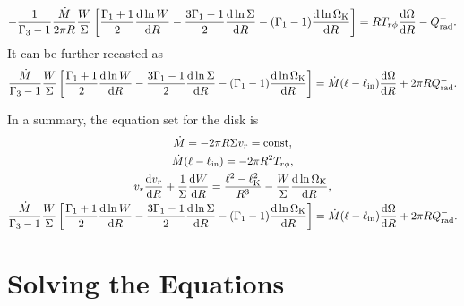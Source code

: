 \documentclass[oneside]{book}
\def\rd{{\rm d}}
\begin{document}
\begin{equation}
-\frac{1}{\Gamma_3-1}\frac{\dot M}{2\pi R}\frac{W}{\Sigma}
\left[\frac{\Gamma_1+1}{2}\frac{\rd \ln W}{\rd R}-
\frac{3\Gamma_1-1}{2}\frac{\rd \ln \Sigma}{\rd R}
-(\Gamma_1-1)\frac{\rd\ln\Omega_{\rm K}}{\rd R}\right]
=RT_{r\phi}\frac{\rd\Omega}{\rd R}-Q_{\rm rad}^-.
\end{equation}
It can be further recasted as
\begin{equation}
\frac{\dot M}{\Gamma_3-1}\frac{W}{\Sigma}
\left[\frac{\Gamma_1+1}{2}\frac{\rd \ln W}{\rd R}-
\frac{3\Gamma_1-1}{2}\frac{\rd \ln \Sigma}{\rd R}
-(\Gamma_1-1)\frac{\rd\ln\Omega_{\rm K}}{\rd R}\right]
=\dot M (\ell-\ell_{\rm in})\frac{\rd\Omega}{\rd R}+2\pi R Q_{\rm rad}^-.
\end{equation}

In a summary, the equation set for the disk is 
\begin{gather}
 \dot M=-2\pi R\Sigma v_r={\rm const},\\
\dot M(\ell-\ell_{\rm in})=-2\pi R^2 T_{r\phi},\\
v_r\frac{\rd v_r}{\rd R}+\frac{1}{\Sigma}\frac{\rd W}{\rd R}=
\frac{\ell^2-\ell_{\rm K}^2}{R^3}-\frac{W}{\Sigma}\frac{\rd\ln\Omega_{\rm K}}{\rd R},\\
\frac{\dot M}{\Gamma_3-1}\frac{W}{\Sigma}
\left[\frac{\Gamma_1+1}{2}\frac{\rd \ln W}{\rd R}-
\frac{3\Gamma_1-1}{2}\frac{\rd \ln \Sigma}{\rd R}
-(\Gamma_1-1)\frac{\rd\ln\Omega_{\rm K}}{\rd R}\right]
=\dot M (\ell-\ell_{\rm in})\frac{\rd\Omega}{\rd R}+2\pi R Q_{\rm rad}^-.
\end{gather}

\chapter{Solving the Equations}
\end{document}
